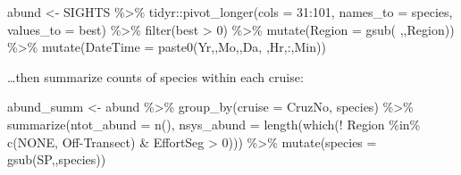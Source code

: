 \documentclass[
]{book}
\newenvironment{Shaded}{\begin{snugshade}}{\end{snugshade}}
\newcommand{\AttributeTok}[1]{\textcolor[rgb]{0.77,0.63,0.00}{#1}}
\newcommand{\DecValTok}[1]{\textcolor[rgb]{0.00,0.00,0.81}{#1}}
\newcommand{\FunctionTok}[1]{\textcolor[rgb]{0.00,0.00,0.00}{#1}}
\newcommand{\NormalTok}[1]{#1}
\newcommand{\OtherTok}[1]{\textcolor[rgb]{0.56,0.35,0.01}{#1}}
\newcommand{\SpecialCharTok}[1]{\textcolor[rgb]{0.00,0.00,0.00}{#1}}
\newcommand{\StringTok}[1]{\textcolor[rgb]{0.31,0.60,0.02}{#1}}
\begin{document}
\begin{Shaded}
\begin{Highlighting}[]
\NormalTok{abund }\OtherTok{\textless{}{-}}
\NormalTok{  SIGHTS }\SpecialCharTok{\%\textgreater{}\%}
\NormalTok{  tidyr}\SpecialCharTok{::}\FunctionTok{pivot\_longer}\NormalTok{(}\AttributeTok{cols =} \DecValTok{31}\SpecialCharTok{:}\DecValTok{101}\NormalTok{,}
                      \AttributeTok{names\_to =} \StringTok{\textquotesingle{}species\textquotesingle{}}\NormalTok{,}
                      \AttributeTok{values\_to =} \StringTok{\textquotesingle{}best\textquotesingle{}}\NormalTok{) }\SpecialCharTok{\%\textgreater{}\%}
  \FunctionTok{filter}\NormalTok{(best }\SpecialCharTok{\textgreater{}} \DecValTok{0}\NormalTok{) }\SpecialCharTok{\%\textgreater{}\%}
  \FunctionTok{mutate}\NormalTok{(}\AttributeTok{Region =} \FunctionTok{gsub}\NormalTok{(}\StringTok{\textquotesingle{} \textquotesingle{}}\NormalTok{,}\StringTok{\textquotesingle{}\textquotesingle{}}\NormalTok{,Region)) }\SpecialCharTok{\%\textgreater{}\%}
  \FunctionTok{mutate}\NormalTok{(}\AttributeTok{DateTime =} \FunctionTok{paste0}\NormalTok{(Yr,}\StringTok{\textquotesingle{}{-}\textquotesingle{}}\NormalTok{,Mo,}\StringTok{\textquotesingle{}{-}\textquotesingle{}}\NormalTok{,Da,}\StringTok{\textquotesingle{} \textquotesingle{}}\NormalTok{,Hr,}\StringTok{\textquotesingle{}:\textquotesingle{}}\NormalTok{,Min))}
\end{Highlighting}
\end{Shaded}

\ldots then summarize counts of species within each cruise:

\begin{Shaded}
\begin{Highlighting}[]
\NormalTok{abund\_summ }\OtherTok{\textless{}{-}}
\NormalTok{  abund }\SpecialCharTok{\%\textgreater{}\%}
  \FunctionTok{group\_by}\NormalTok{(}\AttributeTok{cruise =}\NormalTok{ CruzNo, species) }\SpecialCharTok{\%\textgreater{}\%}
  \FunctionTok{summarize}\NormalTok{(}\AttributeTok{ntot\_abund =} \FunctionTok{n}\NormalTok{(),}
            \AttributeTok{nsys\_abund =} \FunctionTok{length}\NormalTok{(}\FunctionTok{which}\NormalTok{(}\SpecialCharTok{!}\NormalTok{ Region }\SpecialCharTok{\%in\%} \FunctionTok{c}\NormalTok{(}\StringTok{\textquotesingle{}NONE\textquotesingle{}}\NormalTok{, }
                                                      \StringTok{\textquotesingle{}Off{-}Transect\textquotesingle{}}\NormalTok{) }\SpecialCharTok{\&} 
\NormalTok{                                        EffortSeg }\SpecialCharTok{\textgreater{}} \DecValTok{0}\NormalTok{))) }\SpecialCharTok{\%\textgreater{}\%}
  \FunctionTok{mutate}\NormalTok{(}\AttributeTok{species =} \FunctionTok{gsub}\NormalTok{(}\StringTok{\textquotesingle{}SP\textquotesingle{}}\NormalTok{,}\StringTok{\textquotesingle{}\textquotesingle{}}\NormalTok{,species))}
\end{Highlighting}
\end{Shaded}
\end{document}
